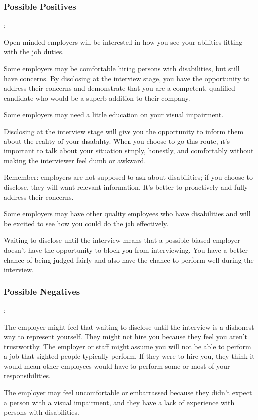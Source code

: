 \subsubsection*{Possible Positives}:

Open-minded employers will be interested in how you see your abilities fitting with the job duties.

Some employers may be comfortable hiring persons with disabilities, but still have concerns. By disclosing at the interview stage, you have the opportunity to address their concerns and demonstrate that you are a competent, qualified candidate who would be a superb addition to their company.

Some employers may need a little education on your visual impairment.

Disclosing at the interview stage will give you the opportunity to inform them about the reality of your disability. When you choose to go this route, it's important to talk about your situation simply, honestly, and comfortably without making the interviewer feel dumb or awkward.

Remember: employers are not supposed to ask about disabilities; if you choose to disclose, they will want relevant information. It's better to proactively and fully address their concerns.

Some employers may have other quality employees who have disabilities and will be excited to see how you could do the job effectively.

Waiting to disclose until the interview means that a possible biased employer doesn't have the opportunity to block you from interviewing. You have a better chance of being judged fairly and also have the chance to perform well during the interview.

\subsubsection*{Possible Negatives}:

The employer might feel that waiting to disclose until the interview is a dishonest way to represent yourself. They might not hire you because they feel you aren't trustworthy.
The employer or staff might assume you will not be able to perform a job that sighted people typically perform. If they were to hire you, they think it would mean other employees would have to perform some or most of your responsibilities.

The employer may feel uncomfortable or embarrassed because they didn't expect a person with a visual impairment, and they have a lack of experience with persons with disabilities.

